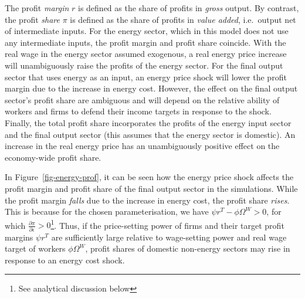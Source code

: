 \documentclass[
  letterpaper,
  DIV=11,
  numbers=noendperiod]{scrreprt}
\begin{document}
The profit \emph{margin} \(r\) is defined as the share of profits in
\emph{gross} output. By contrast, the profit \emph{share} \(\pi\) is
defined as the share of profits in \emph{value added}, i.e.~output net
of intermediate inputs. For the energy sector, which in this model does
not use any intermediate inputs, the profit margin and profit share
coincide. With the real wage in the energy sector assumed exogenous, a
real energy price increase will unambiguously raise the profits of the
energy sector. For the final output sector that uses energy as an input,
an energy price shock will lower the profit margin due to the increase
in energy cost. However, the effect on the final output sector's profit
share are ambiguous and will depend on the relative ability of workers
and firms to defend their income targets in response to the shock.
Finally, the total profit share incorporates the profits of the energy
input sector and the final output sector (this assumes that the energy
sector is domestic). An increase in the real energy price has an
unambiguously positive effect on the economy-wide profit share.

In Figure~\ref{fig-energy-prof}, it can be seen how the energy price
shock affects the profit margin and profit share of the final output
sector in the simulations. While the profit margin \emph{falls} due to
the increase in energy cost, the profit share \emph{rises}. This is
because for the chosen parameterisation, we have
\(\psi r^T-\phi\Omega^W>0\), for which
\(\frac{\partial \pi}{\partial \epsilon} > 0\)\footnote{See analytical
  discussion below}. Thus, if the price-setting power of firms and their
target profit margins \(\psi r^T\) are sufficiently large relative to
wage-setting power and real wage target of workers \(\phi\Omega^W\),
profit shares of domestic non-energy sectors may rise in response to an
energy cost shock.
\end{document}
